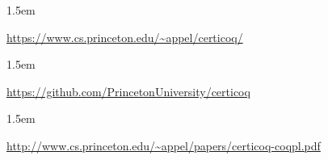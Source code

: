 \documentclass[12pt,twoside]{article}
\begin{document}
\begin{mddefinitions}%


\begin{mdbmarginx}{}{}{}{1.5em}%
\begin{mddefdata}%
\href{https://www.cs.princeton.edu/~appel/certicoq/}{{\ttfamily https://\hspace{0pt}www.\hspace{0pt}cs.\hspace{0pt}princeton.\hspace{0pt}edu/\hspace{0pt}\textasciitilde{}appel/\hspace{0pt}certicoq/\hspace{0pt}}}
\end{mddefdata}%
\end{mdbmarginx}%


\begin{mdbmarginx}{}{}{}{1.5em}%
\begin{mddefdata}%
\href{https://github.com/PrincetonUniversity/certicoq}{{\ttfamily https://\hspace{0pt}github.\hspace{0pt}com/\hspace{0pt}PrincetonUniversity/\hspace{0pt}certicoq}}
\end{mddefdata}%
\end{mdbmarginx}%


\begin{mdbmarginx}{}{}{}{1.5em}%
\begin{mddefdata}%
\href{http://www.cs.princeton.edu/~appel/papers/certicoq-coqpl.pdf}{{\ttfamily http://\hspace{0pt}www.\hspace{0pt}cs.\hspace{0pt}princeton.\hspace{0pt}edu/\hspace{0pt}\textasciitilde{}appel/\hspace{0pt}papers/\hspace{0pt}certicoq-\hspace{0pt}coqpl.\hspace{0pt}pdf}}%
\end{mddefdata}%
\end{mdbmarginx}%
\end{mddefinitions}%
\end{document}
